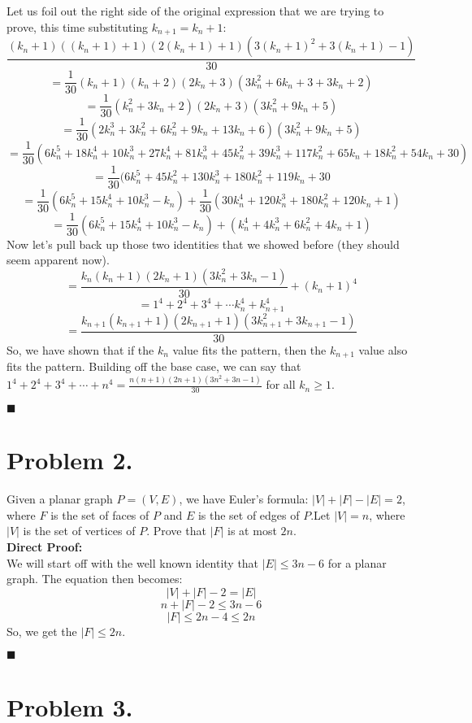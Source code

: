 \documentclass[11pt]{article}
\begin{document}
Let us foil out the right side of the original expression that we are trying to prove, this time substituting $k_{n+1}=k_n +1$:
\[\frac{(k_n+1)((k_n+1)+1)(2(k_n+1)+1)(3(k_n+1)^2+3(k_n+1) -1)}{30}\]
\[=\frac{1}{30}(k_n+1)(k_n+2)(2k_n+3)(3k_n^2+6k_n+3+3k_n+2)\]
\[=\frac{1}{30}(k_n^2+3k_n+2)(2k_n+3)(3k_n^2+9k_n+5)\]
\[=\frac{1}{30}(2k_n^3+3k_n^2+6k_n^2+9k_n+13k_n+6)(3k_n^2+9k_n+5)\]
\[=\frac{1}{30}(6k_n^5+18k_n^4+10k_n^3+27k_n^4+81k_n^3+45k_n^2+39k_n^3+117k_n^2+65k_n+18k_n^2+54k_n+30)\]
\[=\frac{1}{30}(6k_n^5+45k_n^2+130k_n^3+180k_n^2+119k_n+30\]
\[=\frac{1}{30}(6k_n^5+15k_n^4+10k_n^3-k_n) + \frac{1}{30}(30k_n^4+120k_n^3+180k_n^2+120k_n+1)\]
\[=\frac{1}{30}(6k_n^5+15k_n^4+10k_n^3-k_n) + (k_n^4+4k_n^3+6k_n^2+4k_n+1)\]
Now let's pull back up those two identities that we showed before (they should seem apparent now).
\[=\frac{k_n(k_n+1)(2k_n+1)(3k_n^2+3k_n-1)}{30} + (k_n +1)^4\]
\[= 1^4 +2^4 +3^4 + \cdots k_n^4 + k_{n+1}^4\]
\[=\frac{k_{n+1}(k_{n+1}+1)(2k_{n+1}+1)(3k_{n+1}^2+3k_{n+1}-1)}{30}\]
So, we have shown that if the $k_n$ value fits the pattern, then the $k_{n+1}$ value also fits the pattern. Building off the base case, we can say that $1^4 + 2^4 + 3^4 + \cdots +n^4 = \frac{n(n+1)(2n+1)(3n^2 +3n -1)}{30}$ for all $k_n \geq 1$.
\begin{flushright}$\blacksquare$\end{flushright}


\newpage

\section*{Problem 2.}

\noindent
Given a planar graph $P = (V,E)$, we have Euler's formula: $|V|+|F| -|E| =2$, where $F$ is the set of faces of $P$ and $E$ is the set of edges of $P$.Let $|V| =n$, where $|V|$ is the set of vertices of $P$. Prove that $|F|$ is at most $2n$.\\

{\bf Direct Proof: }\\
We will start off with the well known identity that $|E| \leq 3n-6$ for a planar graph. The equation then becomes:
\[|V|+|F|-2 =|E|\]
\[n +|F| -2 \leq 3n-6\]
\[|F| \leq 2n-4 \leq 2n\]
So, we get the $|F| \leq 2n$.
\begin{flushright}$\blacksquare$\end{flushright}

\newpage


\section*{Problem 3.}
\end{document}
